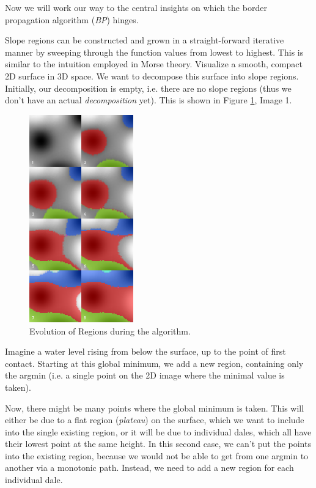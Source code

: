 \documentclass[a4paper,12pt,notitlepage,fullpage]{paper}
\theoremstyle{plain}
\theoremstyle{definition}
\begin{document}
Now we will work our way to the central insights on which the border propagation algorithm (\emph{BP}) hinges.

Slope regions can be constructed and grown in a straight-forward iterative manner by sweeping through the function values from lowest to highest. 
This is similar to the intuition employed in Morse theory\cite{MatsumotoYukio2002AitM}.
Visualize a smooth, compact 2D surface in 3D space.
We want to decompose this surface into slope regions.
Initially, our decomposition is empty, i.e. there are no slope regions (thus we don't have an actual \emph{decomposition} yet). This is shown in Figure \ref{fig:evolution}, Image 1.

\begin{figure}
\centering
\includegraphics[width=0.4\textwidth]{img/slope_evolution.png}
\caption{Evolution of Regions during the algorithm.}
\label{fig:evolution}
\end{figure}

Imagine a water level rising from below the surface, up to the point of first contact.
Starting at this global minimum, we add a new region, containing only the argmin (i.e. a single point on the 2D image where the minimal value is taken).

Now, there might be many points where the global minimum is taken.
This will either be due to a flat region (\emph{plateau}) on the surface, which we want to include into the single existing region, or it will be due to individual dales, which all have their lowest point at the same height.
In this second case, we can't put the points into the existing region, because we would not be able to get from one argmin to another via a monotonic path.
Instead, we need to add a new region for each individual dale.
\end{document}
